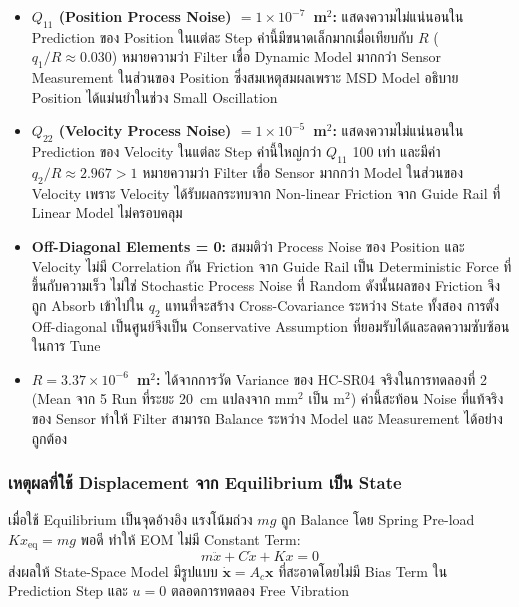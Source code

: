 \begin{itemize}
    \item \textbf{$Q_{11}$ (Position Process Noise) $= 1\times10^{-7}$~m$^2$:}
          แสดงความไม่แน่นอนใน Prediction ของ Position ในแต่ละ Step
          ค่านี้มีขนาดเล็กมากเมื่อเทียบกับ $R$ ($q_1/R \approx 0.030$)
          หมายความว่า Filter เชื่อ Dynamic Model มากกว่า Sensor Measurement
          ในส่วนของ Position ซึ่งสมเหตุสมผลเพราะ MSD Model อธิบาย Position
          ได้แม่นยำในช่วง Small Oscillation

    \item \textbf{$Q_{22}$ (Velocity Process Noise) $= 1\times10^{-5}$~m$^2$:}
          แสดงความไม่แน่นอนใน Prediction ของ Velocity ในแต่ละ Step
          ค่านี้ใหญ่กว่า $Q_{11}$ 100 เท่า และมีค่า $q_2/R \approx 2.967 > 1$
          หมายความว่า Filter เชื่อ Sensor มากกว่า Model ในส่วนของ Velocity
          เพราะ Velocity ได้รับผลกระทบจาก Non-linear Friction จาก Guide Rail
          ที่ Linear Model ไม่ครอบคลุม

    \item \textbf{Off-Diagonal Elements = 0:}
          สมมติว่า Process Noise ของ Position และ Velocity
          ไม่มี Correlation กัน Friction จาก Guide Rail เป็น Deterministic Force
          ที่ขึ้นกับความเร็ว ไม่ใช่ Stochastic Process Noise ที่ Random
          ดังนั้นผลของ Friction จึงถูก Absorb เข้าไปใน $q_2$ แทนที่จะสร้าง
          Cross-Covariance ระหว่าง State ทั้งสอง
          การตั้ง Off-diagonal เป็นศูนย์จึงเป็น Conservative Assumption
          ที่ยอมรับได้และลดความซับซ้อนในการ Tune

    \item \textbf{$R = 3.37\times10^{-6}$~m$^2$:}
          ได้จากการวัด Variance ของ HC-SR04 จริงในการทดลองที่ 2
          (Mean จาก 5 Run ที่ระยะ 20~cm แปลงจาก mm$^2$ เป็น m$^2$)
          ค่านี้สะท้อน Noise ที่แท้จริงของ Sensor ทำให้ Filter
          สามารถ Balance ระหว่าง Model และ Measurement ได้อย่างถูกต้อง
\end{itemize}

\subsubsection{เหตุผลที่ใช้ Displacement จาก Equilibrium เป็น State}

เมื่อใช้ Equilibrium เป็นจุดอ้างอิง แรงโน้มถ่วง $mg$ ถูก Balance
โดย Spring Pre-load $Kx_\text{eq} = mg$ พอดี ทำให้ EOM ไม่มี Constant Term:
\begin{equation}
    m\ddot{x} + C\dot{x} + Kx = 0
\end{equation}
ส่งผลให้ State-Space Model มีรูปแบบ $\dot{\mathbf{x}} = A_c\mathbf{x}$
ที่สะอาดโดยไม่มี Bias Term ใน Prediction Step
และ $u = 0$ ตลอดการทดลอง Free Vibration

